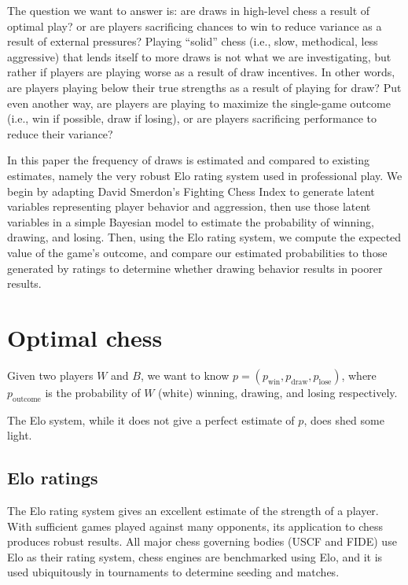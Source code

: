 \documentclass{article}
\begin{document}
The question we want to answer is: are draws in high-level chess a result of optimal play?
or are players sacrificing chances to win to reduce variance as a result of external pressures?
Playing ``solid'' chess (i.e., slow, methodical, less aggressive) that lends itself to more draws is not what we are investigating,
but rather if players are playing worse as a result of draw incentives. In other words, are players
playing below their true strengths as a result of playing for draw?
Put even another way, are players are playing to maximize the single-game outcome (i.e., win if possible, draw if losing),
or are players sacrificing performance to reduce their variance?

In this paper the frequency of draws is estimated and compared to existing estimates, namely the very robust Elo rating system used in professional play. We begin by adapting David Smerdon's Fighting Chess Index to generate latent variables representing player behavior and aggression,
then use those latent variables in a simple Bayesian model to estimate the probability of winning, drawing, and losing.
Then, using the Elo rating system, we compute the expected value of the game's outcome, and compare our estimated probabilities to those generated by ratings to determine whether drawing behavior results in poorer results.

\section{Optimal chess}

Given two players $W$ and $B$, we want to know
$p=(p_{\text{win}}, p_{\text{draw}}, p_{\text{lose}})$, where $p_{\text{outcome}}$ is
the probability of $W$ (white) winning, drawing, and losing respectively.

The Elo system, while it does not give a perfect estimate of $p$, does shed some light.

\subsection{Elo ratings}
The Elo rating system gives an excellent estimate of the strength of a player.
With sufficient games played against many opponents, its application to chess produces robust results. All major chess governing bodies (USCF and FIDE) use Elo as their rating system,
chess engines are benchmarked using Elo, and it is used ubiquitously in tournaments to determine seeding and matches.
\end{document}
